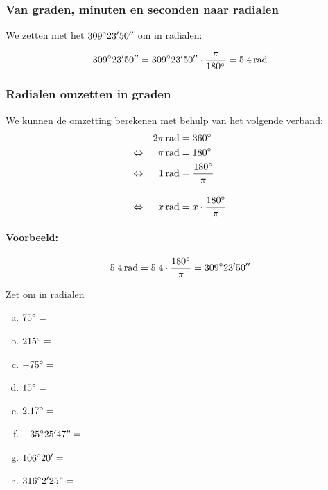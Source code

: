 \documentclass[a4paper,12pt]{article}
\begin{document}
\subsubsection{Van graden, minuten en seconden naar radialen}

We zetten met het  $309^\circ 23' 50''$ om in radialen:

$$309\degree 23' 50''=309\degree 23' 50''\cdot \dfrac{\pi}{180\degree}=5.4\rad$$

\subsubsection{Radialen omzetten in graden}
We kunnen de omzetting berekenen met behulp van het volgende verband:
\begin{alignat*}{2}
     &&2\pi\rad &=360\degree\\
\LRA &&\pi \rad &=180\degree\\
\LRA &&  1 \rad &= \frac{180\degree}{\pi}\\[1em]
\LRA &&  x \rad &= x\cdot\frac{180\degree}{\pi}
\end{alignat*}

\paragraph{Voorbeeld:}
$$5.4 \rad=5.4\cdot\dfrac{180\degree}{\pi}=309\degree 23' 50''$$

\begin{oefening} Zet om in radialen
\begin{multicols}{2}
\begin{enumerate}[(a)]
  \itemsep1em
  \item $75^\circ=$\arulefill
  \item $215^\circ=$\arulefill
  \item $-75^\circ=$\arulefill
  \item $15^\circ=$\arulefill
  \item $2.17^\circ=$\arulefill
  \item $-35^\circ25'47"=$\arulefill
  \item $106^\circ20'=$\arulefill
  \item $316^\circ2'25"=$\arulefill
\end{enumerate}
\end{multicols}
\end{oefening}
\end{document}
